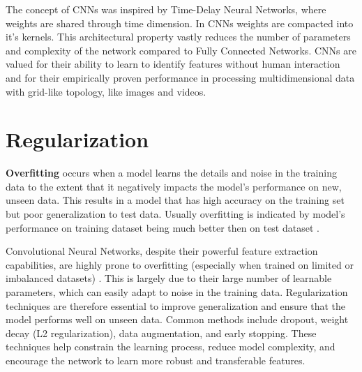The concept of CNNs was inspired by Time-Delay Neural Networks, where weights are shared through time dimension. In CNNs weights are compacted into it's kernels. This architectural property vastly reduces the number of parameters and complexity of the network compared to Fully Connected Networks. CNNs are valued for their ability to learn to identify features without human interaction and for their empirically proven performance in processing multidimensional data with grid-like topology, like images and videos.

\section{Regularization}

\begin{definition}
  \textbf{Overfitting} \autocite{oshea2015introductionconvolutionalneuralnetworks} occurs when a model learns the details and noise in the training data to the extent that it negatively impacts the model’s performance on new, unseen data. This results in a model that has high accuracy on the training set but poor generalization to test data. Usually overfitting is indicated by model's performance on training dataset being much better then on test dataset \autocite{9944190}.
\end{definition}

Convolutional Neural Networks, despite their powerful feature extraction capabilities, are highly prone to overfitting (especially when trained on limited or imbalanced datasets) \autocite{alzubaidi2021review}. This is largely due to their large number of learnable parameters, which can easily adapt to noise in the training data. Regularization techniques are therefore essential to improve generalization and ensure that the model performs well on unseen data. Common methods include dropout, weight decay (L2 regularization), data augmentation, and early stopping. These techniques help constrain the learning process, reduce model complexity, and encourage the network to learn more robust and transferable features.

